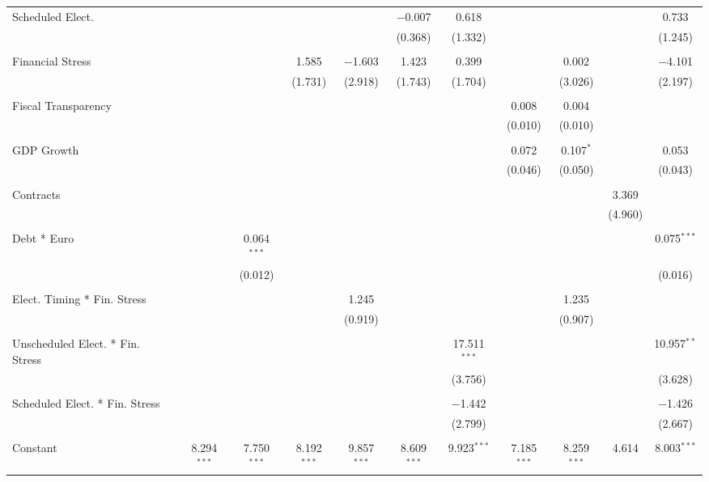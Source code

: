 \begin{table}[!htbp]
\begin{tabular}{@{\extracolsep{5pt}}lcccccccccc}
 Scheduled Elect. &  &  &  &  & $-$0.007 & 0.618 &  &  &  & 0.733 \\ 
  &  &  &  &  & (0.368) & (1.332) &  &  &  & (1.245) \\ 
  & & & & & & & & & & \\ 
 Financial Stress &  &  & 1.585 & $-$1.603 & 1.423 & 0.399 &  & 0.002 &  & $-$4.101 \\ 
  &  &  & (1.731) & (2.918) & (1.743) & (1.704) &  & (3.026) &  & (2.197) \\ 
  & & & & & & & & & & \\ 
 Fiscal Transparency &  &  &  &  &  &  & 0.008 & 0.004 &  &  \\ 
  &  &  &  &  &  &  & (0.010) & (0.010) &  &  \\ 
  & & & & & & & & & & \\ 
 GDP Growth &  &  &  &  &  &  & 0.072 & 0.107$^{*}$ &  & 0.053 \\ 
  &  &  &  &  &  &  & (0.046) & (0.050) &  & (0.043) \\ 
  & & & & & & & & & & \\ 
 Contracts &  &  &  &  &  &  &  &  & 3.369 &  \\ 
  &  &  &  &  &  &  &  &  & (4.960) &  \\ 
  & & & & & & & & & & \\ 
 Debt * Euro &  & 0.064$^{***}$ &  &  &  &  &  &  &  & 0.075$^{***}$ \\ 
  &  & (0.012) &  &  &  &  &  &  &  & (0.016) \\ 
  & & & & & & & & & & \\ 
 Elect. Timing * Fin. Stress &  &  &  & 1.245 &  &  &  & 1.235 &  &  \\ 
  &  &  &  & (0.919) &  &  &  & (0.907) &  &  \\ 
  & & & & & & & & & & \\ 
 Unscheduled Elect. * Fin. Stress &  &  &  &  &  & 17.511$^{***}$ &  &  &  & 10.957$^{**}$ \\ 
  &  &  &  &  &  & (3.756) &  &  &  & (3.628) \\ 
  & & & & & & & & & & \\ 
 Scheduled Elect. * Fin. Stress &  &  &  &  &  & $-$1.442 &  &  &  & $-$1.426 \\ 
  &  &  &  &  &  & (2.799) &  &  &  & (2.667) \\ 
  & & & & & & & & & & \\ 
 Constant & 8.294$^{***}$ & 7.750$^{***}$ & 8.192$^{***}$ & 9.857$^{***}$ & 8.609$^{***}$ & 9.923$^{***}$ & 7.185$^{***}$ & 8.259$^{***}$ & 4.614 & 8.003$^{***}$ \\ 

\end{tabular}
\end{table}
